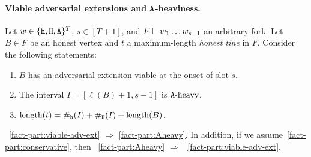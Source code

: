 



    \paragraph{Viable adversarial extensions and $\mathtt{A}$-heaviness.} 
    Let $w \in \{\mathtt{h}, \mathtt{H}, \mathtt{A}\}^T$,   
    $s \in [T + 1]$, and 
    $F \vdash w_1 \ldots w_{s - 1}$ an arbitrary fork. 
    Let $B \in F$ be an honest vertex 
    and $t$ a maximum-length \emph{honest tine} in $F$.
    Consider the following statements: 
    \begin{enumerate}[label=(\alph*)]
      \item \label{fact-part:viable-adv-ext} $B$ has an adversarial extension viable at the onset of slot $s$.
      \item \label{fact-part:Aheavy} The interval $I = [\ell(B) + 1, s - 1]$ is $\mathtt{A}\text{-heavy}$. 
      \item \label{fact-part:conservative} $\operatorname{length}(t) = \#_{\mathtt{h}}(I) + \#_{\mathtt{H}}(I) + \operatorname{length}(B)$.     
    \end{enumerate}



    \begin{fact}[]\label{fact:fork-structure}
    ~\ref{fact-part:viable-adv-ext} $\Longrightarrow$
    \ref{fact-part:Aheavy}.
    In addition, if we assume~\ref{fact-part:conservative}, then 
    ~\ref{fact-part:Aheavy} $\Longrightarrow$ 
    ~\ref{fact-part:viable-adv-ext}.
    \end{fact}

